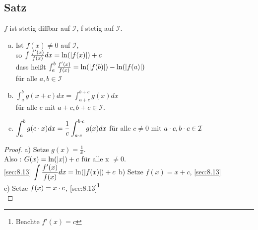\subsection[Satz]{Satz}\label{sec:8.14}
$f$ ist stetig diffbar auf $\mathcal{I}$, f stetig auf $\mathcal{I}$.\\
\begin{enumerate}[a)]
\item Ist $f(x) \ne 0$ auf $\mathcal{I}$,\\
so $\int \frac{f'(x)}{f(x)}dx = \ln(\lvert f(x) \rvert) + c$\\
dass hei\ss t $\int_{a}^{b} \frac{f'(x)}{f(x)} = \ln(\lvert f(b) \rvert) - \ln(\lvert f(a) \rvert)$\\
für alle $a,b \in \mathcal{I}$
\item ${\displaystyle \int_{a}^{b} g(x + c)dx = \int_{a+c}^{b+c} g(x)dx}$\\
für alle c mit $a+c, b+c \in \mathcal{I}$.\\
\item ${\displaystyle \int_{a}^{b} g(c \cdot x)dx = \frac{1}{c}\int_{a \cdot c}^{b \cdot c}g(x)dx}$ für alle $c \ne 0 $ mit $a\cdot c, b\cdot c\in \mathcal{I}$\\
\end{enumerate}
\begin{proof}
a) Setze $g(x)= \frac{1}{x}$.\\
Also : $G(x) = \ln(\lvert x \rvert) + c$ für alle x $\ne 0$.\\
\ref{sec:8.13} ${\displaystyle \int \frac{f'(x)}{f(x)}dx} = \ln(\lvert f(x) \rvert) + c$
b) Setze $f(x) = x + c$, \ref{sec:8.13}\\
c) Setze $f(x) = x \cdot c$, \ref{sec:8.13}\footnote{Beachte $f'(x)=c$}\\
\end{proof}

